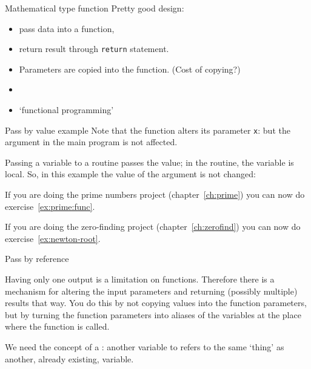 \begin{slide}{Mathematical type function}
  \label{sl:func-functional}
  Pretty good design:
  \begin{itemize}
  \item pass data into a function,
  \item return result through \lstinline{return} statement.
  \item Parameters are copied into the function. (Cost of copying?)
  \item {}
  \item `functional programming'
  \end{itemize}
\end{slide}

\begin{slide}{Pass by value example}
  \label{sl:func-functional-ex}
  Note that the function alters its parameter \lstinline{x}:
  but the argument in the main program is not affected.
\end{slide}

Passing a variable to a routine passes the value; in the routine, the
variable is local. So, in this example
the value of the argument is not changed:


\begin{exercise}
  If you are doing the prime numbers project (chapter~\ref{ch:prime}) you can
  now do exercise~\ref{ex:prime:func}.
\end{exercise}

\begin{exercise}
  If you are doing the zero-finding project (chapter~\ref{ch:zerofind})
  you can now do exercise~\ref{ex:newton-root}.
\end{exercise}

 {Pass by reference}
\label{sec:pass-by-ref}
  
Having only one output is a limitation on functions. Therefore there
is a mechanism for altering the input parameters and returning
(possibly multiple) results that way. You do this by not copying
values into the function parameters, but by turning the function
parameters into aliases of the variables at the place where the
function is called.

We need the concept of a :
another variable to refers to the same `thing' as another,
already existing, variable.

